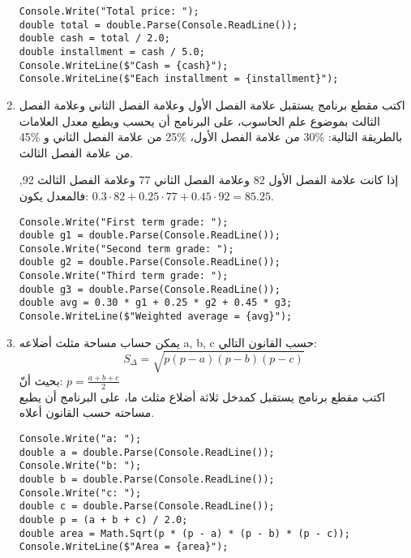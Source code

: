 ﻿\documentclass[12pt]{article}
\begin{document}
\begin{enumerate}[itemsep=2em]
\ifwithsols
\begin{boxSolution}
\begin{english}
\begin{verbatim}
Console.Write("Total price: ");
double total = double.Parse(Console.ReadLine());
double cash = total / 2.0;
double installment = cash / 5.0;
Console.WriteLine($"Cash = {cash}");
Console.WriteLine($"Each installment = {installment}");
\end{verbatim}
\end{english}
\end{boxSolution}
\clearpage
\fi

    \item
    اكتب مقطع برنامج يستقبل علامة الفصل الأول وعلامة الفصل الثاني وعلامة الفصل الثالث بموضوع علم الحاسوب، على البرنامج أن يحسب ويطبع معدل العلامات بالطريقة التالية:
     \%30 من علامة الفصل الأول، \%25 من علامة الفصل الثاني و \%45 من علامة الفصل الثالث. \\
     \begin{boxExample}
        إذا كانت علامة الفصل الأول 82 وعلامة الفصل الثاني 77 وعلامة الفصل الثالث 92, فالمعدل يكون: $0.3 \cdot 82 + 0.25 \cdot 77 + 0.45 \cdot 92 = 85.25$.
     \end{boxExample}

\ifwithsols
\begin{boxSolution}
\begin{english}
\begin{verbatim}
Console.Write("First term grade: ");
double g1 = double.Parse(Console.ReadLine());
Console.Write("Second term grade: ");
double g2 = double.Parse(Console.ReadLine());
Console.Write("Third term grade: ");
double g3 = double.Parse(Console.ReadLine());
double avg = 0.30 * g1 + 0.25 * g2 + 0.45 * g3;
Console.WriteLine($"Weighted average = {avg}");
\end{verbatim}
\end{english}
\end{boxSolution}
\clearpage
\fi

     \item
    يمكن حساب مساحة مثلث أضلاعه a, b, c حسب القانون التالي:
    $$S_\Delta = \sqrt{p (p-a) (p-b) (p-c)}$$
    بحيث أنّ: $p=\frac{a+b+c}{2}$ \\
اكتب مقطع برنامج يستقبل كمدخل ثلاثة أضلاع مثلث ما، على البرنامج أن يطبع مساحته حسب القانون أعلاه.

\ifwithsols
\begin{boxSolution}
\begin{english}
\begin{verbatim}
Console.Write("a: ");
double a = double.Parse(Console.ReadLine());
Console.Write("b: ");
double b = double.Parse(Console.ReadLine());
Console.Write("c: ");
double c = double.Parse(Console.ReadLine());
double p = (a + b + c) / 2.0;
double area = Math.Sqrt(p * (p - a) * (p - b) * (p - c));
Console.WriteLine($"Area = {area}");
\end{verbatim}
\end{english}
\end{boxSolution}
\clearpage
\fi


\end{enumerate}
\end{document}
